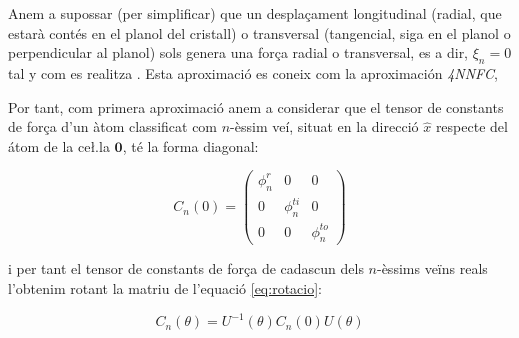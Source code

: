\documentclass[12pt]{article} %
\let\vec\mathbf %
\begin{document}
Anem a supossar (per simplificar) que un despla\c{c}ament longitudinal (radial, que estarà contés en el planol del cristall) o transversal (tangencial, siga en el planol o perpendicular al planol) sols genera una for\c{c}a radial o transversal, es a dir, $\xi_n=0$ tal y com es realitza \cite{Balkanski_2000}. Esta aproximació es coneix com la aproximación \textit{4NNFC},%






Por tant, com primera aproximació anem a considerar que el tensor de constants de for\c{c}a  d'un àtom classificat com $n$-èssim veí, situat en la direcció $\hat x$ respecte del átom de la ce\l.la $\vec 0$, té la forma diagonal:

\begin{equation}
\label{eq:rotacio}
C_n(0)=\begin{pmatrix}
\phi_n^r& 0 &0\\
0 & \phi_n^{ti} & 0 \\
0 & 0 & \phi_n^{to}
\end{pmatrix}
\end{equation}

i per tant el tensor de constants de for\c{c}a de cadascun dels $n$-èssims veïns reals l'obtenim rotant la matriu de l'equació \ref{eq:rotacio}:

\begin{equation}
 C_n(\theta)=U^{-1}(\theta)C_n(0)U(\theta)
\end{equation}
\end{document}
